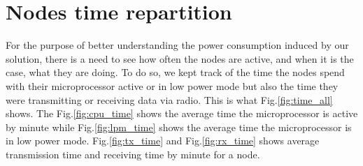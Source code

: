 \section{Nodes time repartition}

For the purpose of better understanding the power consumption induced by our solution, there is a need to see how often the nodes are active, and when it is the case, what they are doing. To do so, we kept track of the time the nodes spend with their microprocessor active or in low power mode but also the time they were transmitting or receiving data via radio. This is what Fig.\ref{fig:time_all} shows. The Fig.\ref{fig:cpu_time} shows the average time the microprocessor is active by minute while Fig.\ref{fig:lpm_time} shows the average time the microprocessor is in low power mode. Fig.\ref{fig:tx_time} and Fig.\ref{fig:rx_time} shows average transmission time and receiving time by minute for a node. \\

